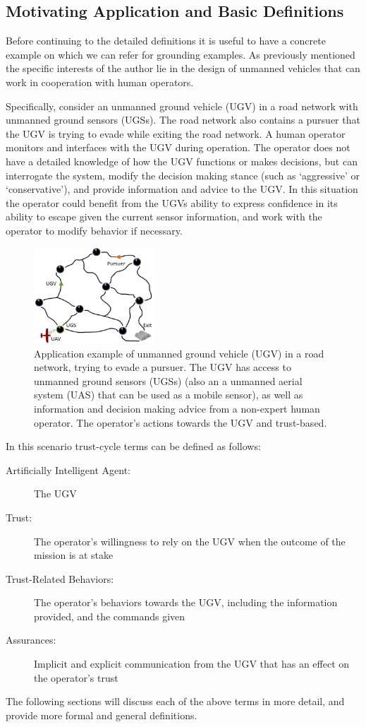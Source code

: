 \subsection{Motivating Application and Basic Definitions}
    Before continuing to the detailed definitions it is useful to have a concrete example on which we can refer for grounding examples. As previously mentioned the specific interests of the author lie in the design of unmanned vehicles that can work in cooperation with human operators.

    Specifically, consider an unmanned ground vehicle (UGV) in a road network with unmanned ground sensors (UGSs). The road network also contains a pursuer that the UGV is trying to evade while exiting the road network. A human operator monitors and interfaces with the UGV during operation. The operator does not have a detailed knowledge of how the UGV functions or makes decisions, but can interrogate the system, modify the decision making stance (such as `aggressive' or `conservative'), and provide information and advice to the UGV. In this situation the operator could benefit from the UGVs ability to express confidence in its ability to escape given the current sensor information, and work with the operator to modify behavior if necessary.

	\begin{figure}[htbp]
    	\centering
     	\includegraphics[width=0.4\textwidth]{Figures/RoadNet}
    	\caption{Application example of unmanned ground vehicle (UGV) in a road network, trying to evade a pursuer. The UGV has access to unmanned ground sensors (UGSs) (also an a unmanned aerial system (UAS) that can be used as a mobile sensor), as well as information and decision making advice from a non-expert human operator. The operator's actions towards the UGV and trust-based.}
        \label{fig:RoadNet}
    \end{figure}

    In this scenario trust-cycle terms can be defined as follows:

    \begin{description}
        \item [Artificially Intelligent Agent:] The UGV
        \item [Trust:] The operator's willingness to rely on the UGV when the outcome of the mission is at stake
        \item [Trust-Related Behaviors:] The operator's behaviors towards the UGV, including the information provided, and the commands given
        \item [Assurances:] Implicit and explicit communication from the UGV that has an effect on the operator's trust
    \end{description}

    The following sections will discuss each of the above terms in more detail, and provide more formal and general definitions.





